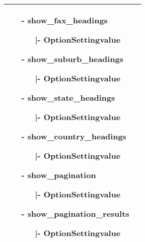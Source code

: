 \begin{minipage}{0.7\textwidth}
\begin{tabular}{|p{} | p{}|}
\begin{itemize}
		\item[-] show\_fax\_headings
			\begin{enumerate}
			   			\item[|-] OptionSettingvalue
			   		\end{enumerate} 
		\item[-] show\_suburb\_headings
			\begin{enumerate}
			   			\item[|-] OptionSettingvalue
			   		\end{enumerate} 
		\item[-] show\_state\_headings
			\begin{enumerate}
			   			\item[|-] OptionSettingvalue
			   		\end{enumerate} 
		\item[-] show\_country\_headings
			\begin{enumerate}
			   			\item[|-] OptionSettingvalue
			   		\end{enumerate} 
		\item[-] show\_pagination
			\begin{enumerate}
			   			\item[|-] OptionSettingvalue
			   		\end{enumerate} 
		\item[-] show\_pagination\_results
			\begin{enumerate}
			   			\item[|-] OptionSettingvalue
			   		\end{enumerate}
	\end{itemize}
\\
\hline
\end{tabular}
\end{minipage}

